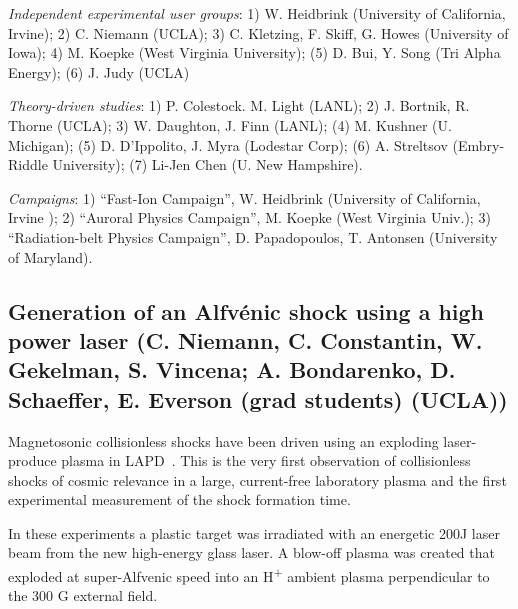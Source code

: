 \documentclass[11pt]{article}
\begin{document}
\begin{description}
\item{\emph{Independent experimental user groups}}: 1) W. Heidbrink
(University of California, Irvine); 2) C. Niemann (UCLA); 3) C. Kletzing, F. Skiff, G. Howes (University of Iowa); 4) M.
Koepke (West Virginia University); (5) D. Bui, Y. Song (Tri Alpha
Energy); (6) J. Judy (UCLA)

\item{\emph{Theory-driven studies}}: 1) P. Colestock. M. Light (LANL);
2) J. Bortnik, R. Thorne (UCLA); 3) W. Daughton, J. Finn (LANL); (4) M.
Kushner (U. Michigan); (5) D. D'Ippolito, J. Myra (Lodestar Corp); (6)
A. Streltsov (Embry-Riddle University); (7) Li-Jen Chen (U. New
Hampshire).

\item{\emph{Campaigns}}: 1) ``Fast-Ion Campaign'', W. Heidbrink
(University of California, Irvine ); 2) ``Auroral Physics Campaign'', M. Koepke (West Virginia Univ.); 3)
``Radiation-belt Physics Campaign'', D. Papadopoulos, T. Antonsen (University of Maryland).




\subsection{Generation of an Alfv\'{e}nic shock
using a high power laser  (C. Niemann, C. Constantin, W. Gekelman,
S. Vincena; A. Bondarenko, D. Schaeffer, E. Everson (grad students) (UCLA))}

Magnetosonic collisionless shocks have been driven using an exploding
laser-produce plasma in LAPD~\citep{schaeffer:2014,niemann:2014}. This is the very first
observation of collisionless shocks of cosmic relevance in a large,
current-free laboratory plasma and the first experimental measurement
of the shock formation time.

In these experiments a plastic target was irradiated with an energetic
200J laser beam from the new high-energy glass laser. A blow-off plasma
was created that exploded at super-Alfvenic speed into an
H\textsuperscript{+} ambient plasma perpendicular to the 300 G external
field.


\end{description}
\end{document}
